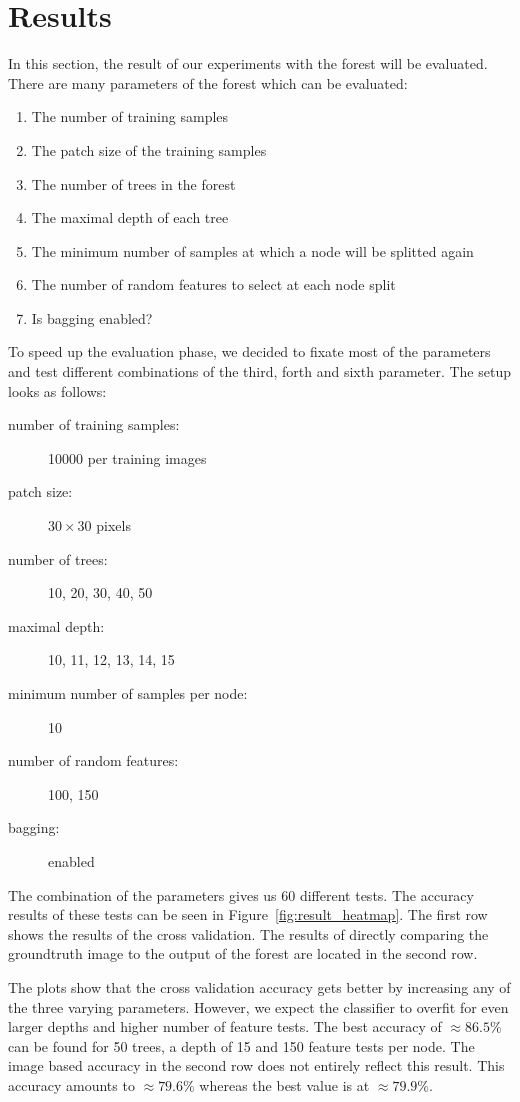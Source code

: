 \section{Results}
\label{sec:results}

In this section, the result of our experiments with the forest will be evaluated. There are many parameters
of the forest which can be evaluated:

\FloatBarrier
\begin{enumerate}
	\item The number of training samples
	\item The patch size of the training samples
	\item The number of trees in the forest
	\item The maximal depth of each tree
	\item The minimum number of samples at which a node will be splitted again
	\item The number of random features to select at each node split
	\item Is bagging enabled?
\end{enumerate}
\FloatBarrier

To speed up the evaluation phase, we decided to fixate most of the parameters and test different combinations
of the third, forth and sixth parameter. The setup looks as follows:

\FloatBarrier
\begin{description}
	\item[number of training samples:] 10000 per training images
	\item[patch size:] $30 \times 30$ pixels
	\item[number of trees:] 10, 20, 30, 40, 50
	\item[maximal depth:] 10, 11, 12, 13, 14, 15
	\item[minimum number of samples per node:] 10
	\item[number of random features:] 100, 150
	\item[bagging:] enabled
\end{description}
\FloatBarrier

The combination of the parameters gives us 60 different tests. The accuracy results of these tests can be seen
in Figure~\ref{fig:result_heatmap}. The first row shows the results of the cross validation. The results
of directly comparing the groundtruth image to the output of the forest are located in the second row. 

The plots show that the cross validation accuracy gets better by increasing any of the three varying parameters.
However, we expect the classifier to overfit for even larger depths and higher number of feature tests. The best
accuracy of $\approx 86.5\%$ can be found for 50 trees, a depth of 15 and 150 feature tests per node. The image based
accuracy in the second row does not entirely reflect this result. This accuracy amounts to $\approx 79.6\%$ whereas
the best value is at $\approx 79.9\%$.

